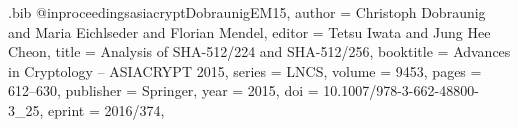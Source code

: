 \documentclass[11pt, a4paper]{article}
\newcommand{\hashlink}[2][black]{\href{https://extgit.iaik.tugraz.at/krypto/nldtool/blob/master/hash/#2}{\color{#1}\nolinkurl{#2}}}
\begin{document}
\begin{itemize}
\begin{itemize}
\end{itemize}




\begin{filecontents*}{\jobname.bib}
@inproceedings{asiacryptDobraunigEM15,
  author    = {Christoph Dobraunig and
               Maria Eichlseder and
               Florian Mendel},
  editor    = {Tetsu Iwata and
               Jung Hee Cheon},
  title     = {Analysis of {SHA-512/224} and {SHA-512/256}},
  booktitle = {Advances in Cryptology -- {ASIACRYPT} 2015},
  series    = {LNCS},
  volume    = {9453},
  pages     = {612--630},
  publisher = {Springer},
  year      = {2015},
  doi       = {10.1007/978-3-662-48800-3_25},
  eprint    = {2016/374},
}


\end{filecontents*}
\end{itemize}
\end{document}
